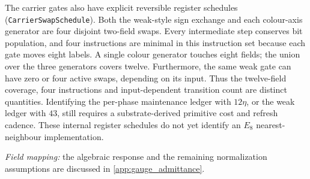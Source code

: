 The carrier gates also have explicit reversible register schedules (\texttt{CarrierSwapSchedule}). Both the weak-style sign exchange and each colour-axis generator are four disjoint two-field swaps. Every intermediate step conserves bit population, and four instructions are minimal in this instruction set because each gate moves eight labels. A single colour generator touches eight fields; the union over the three generators covers twelve. Furthermore, the same weak gate can have zero or four active swaps, depending on its input. Thus the twelve-field coverage, four instructions and input-dependent transition count are distinct quantities. Identifying the per-phase maintenance ledger with $12\eta$, or the weak ledger with $43$, still requires a substrate-derived primitive cost and refresh cadence. These internal register schedules do not yet identify an $E_8$ nearest-neighbour implementation.

\textit{Field mapping:} the algebraic response and the remaining normalization assumptions are discussed in \cref{app:gauge_admittance}.
